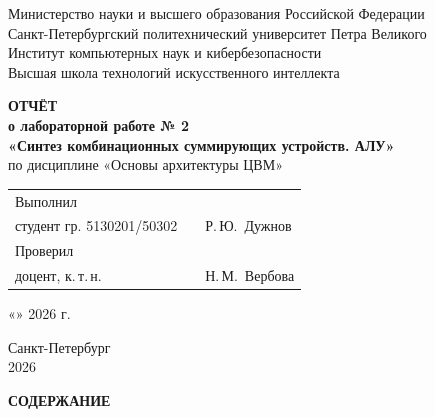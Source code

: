 \documentclass[14pt,a4paper]{extarticle}
\makeatletter
\renewcommand{\tableofcontents}{%
  {\centering\textbf{СОДЕРЖАНИЕ}\par}\vspace{12pt}%
  \@starttoc{toc}}
\newcommand{\StudentName}{Р.\,Ю.~Дужнов}
\newcommand{\StudentGroup}{5130201/50302}
\makeatother
\begin{document}
\begin{titlepage}
\begin{singlespace}
\begin{center}
Министерство науки и высшего образования Российской Федерации\\[2pt]
Санкт-Петербургский политехнический университет Петра Великого\\[2pt]
Институт компьютерных наук и кибербезопасности\\[2pt]
Высшая школа технологий искусственного интеллекта

\vspace{5cm}

\textbf{ОТЧЁТ}\\[6pt]
\textbf{о лабораторной работе № 2}\\[12pt]
\textbf{«Синтез комбинационных суммирующих устройств. АЛУ»}\\[12pt]
по дисциплине «Основы архитектуры ЦВМ»
\end{center}

\vspace{4cm}

\noindent
\begin{tabular}{@{}p{7.2cm}p{3.6cm}l@{}}
Выполнил\\
студент гр. \StudentGroup & \underline{\hspace{3cm}} & \StudentName\\[22pt]
Проверил\\
доцент, к.\,т.\,н. & \underline{\hspace{3cm}} & Н.\,М.~Вербова\\
\end{tabular}

\vspace{1.2cm}
\noindent\hfill «\underline{\hspace{0.9cm}}» \underline{\hspace{3.2cm}} 2026 г.

\vfill
\begin{center}
Санкт-Петербург\\
2026
\end{center}
\end{singlespace}
\end{titlepage}
\setcounter{page}{2}

\begin{singlespace}
\tableofcontents
\end{singlespace}
\end{document}
